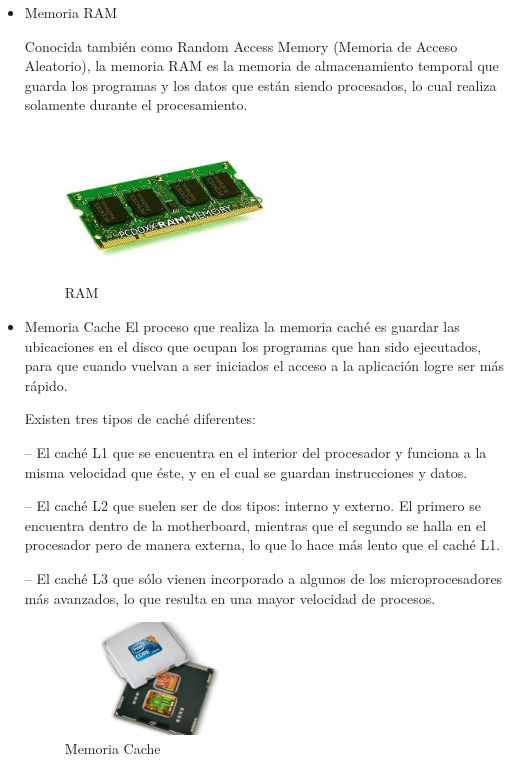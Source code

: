 \documentclass{article}
\begin{document}
\begin{itemize}
    \item Memoria RAM
    
    Conocida también como Random Access Memory (Memoria de Acceso Aleatorio), la memoria RAM es la memoria de almacenamiento temporal que guarda los programas y los datos que están siendo procesados, lo cual realiza solamente durante el procesamiento.

\begin{figure}[h]
    \centering
    \includegraphics[width=0.5\textwidth]{ram.jpg}
    \caption{RAM}
    \label{fig:ram}
\end{figure}
    \item Memoria Cache
    El proceso que realiza la memoria caché es guardar las ubicaciones en el disco que ocupan los programas que han sido ejecutados, para que cuando vuelvan a ser iniciados el acceso a la aplicación logre ser más rápido.

    Existen tres tipos de caché diferentes:

    – El caché L1 que se encuentra en el interior del procesador y funciona a la misma velocidad que éste, y en el cual se guardan instrucciones y datos.

    – El caché L2 que suelen ser de dos tipos: interno y externo. El primero se encuentra dentro de la motherboard, mientras que el segundo se halla en el procesador pero de manera externa, lo que lo hace más lento que el caché L1.

    – El caché L3 que sólo vienen incorporado a algunos de los microprocesadores más avanzados, lo que resulta en una mayor velocidad de procesos.
    
\newpage
    
        \begin{figure}[h]
            \centering
            \includegraphics[width=0.5\textwidth]{cache.jpg}
            \caption{Memoria Cache}
            \label{fig:cache}
        \end{figure}
    

\end{itemize}
\end{document}
